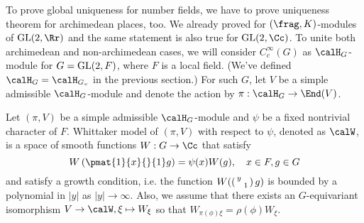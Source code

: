 \begin{comment}
We can think Whittaker models as functions on $\GL(2, F)$ that satisfy the similar equation. 
\begin{definition}
Let $F$ be a non-archimedean local field, $\psi$ a nontrivial additive character of $F$, and let $(\pi, V)$ be an irreducible admissible representation of $\GL(2, F)$. 
A space of functions $W:\GL(2, F) \to \Cc$ satisfying 
$$
W\left( \pmat{1}{x}{}{1} g\right) = \psi(x) W(g), \quad x\in F, g\in\GL(2, F)
$$
is called a Whittaker model for $(\pi, V)$, and denoted as $\calW_{\pi}$. 
\end{definition}

There's no big difference between Whittaker functionals and Whittaker models. 

\begin{theorem}[Local multiplicity one, Whittaker model version]
The space of Whittaker functional is isomorphic to the space of Whittaker models. In particular, $\dim \calW_{\pi} \leq 1$. 
\end{theorem}
\begin{proof}
For a given nonzero $\Lambda$, define $W_{\xi}: \GL(2, F) \to \Cc$ as 
$
W_{\xi}(g) = \Lambda(\pi(g)\xi)
$
for $\xi\in V$. Then $W_{\pi(g)\xi} = \rho(g)W_{\xi}$ (where $\rho$ is the action of $\GL(2, F)$ by right translation), so the space $\calW = \{W_{\xi}\,:\, \xi\in V\}$ is closed under right translation and isomorphic to $\pi$. 
Conversely, if $\calW$ is given with an isomorphism $\xi \mapsto W_{\xi}$ between $\pi$ and $\calW$, then $\Lambda:\xi \mapsto W_{\xi}(1)$ define a nonzero Whittaker functional. 
The last statement follows from the local multiplicity one theorem (Theorem \ref{nonarchmultone}). 
\end{proof}
\end{comment}

To prove global uniqueness for number fields, we have to prove uniqueness theorem for archimedean places, too. We already proved for $(\frag, K)$-modules of $\GL(2, \Rr)$ and the same statement is also  true for $\GL(2, \Cc)$. 
To unite both archimedean and non-archimedean cases, we will consider $C_{c}^{\infty}(G)$ as $\calH_{G}$-module for $G = \mathrm{GL}(2, F)$, where $F$ is a local field. (We've defined $\calH_G = \calH_{G_{v}}$ in the previous section.)
For such $G$, let $V$ be a simple admissible $\calH_{G}$-module and denote the action by $\pi:\calH_{G}\to \End(V)$. 

\begin{definition}
Let $(\pi, V)$ be a simple admissible $\calH_{G}$-module and $\psi$ be a fixed nontrivial character of $F$. 
Whittaker model of $(\pi, V)$ with respect to $\psi$, denoted as $\calW$, is a space of smooth functions $W: G\to \Cc$ that satisfy
$$
W\left(\pmat{1}{x}{}{1}g\right) = \psi(x)W(g), \quad x\in F, g\in G
$$
and satisfy a growth condition, i.e. the function $W(\left(\begin{smallmatrix} y &  \\  & 1 \end{smallmatrix}\right)g)$ is bounded by a polynomial in $|y|$ as $|y| \to \infty$. Also, we assume that there exists an $G$-equivariant  isomorphism $V\to \calW, \xi\mapsto W_{\xi}$ so that $W_{\pi(\phi)\xi} = \rho(\phi)W_{\xi}$. 
\end{definition}

